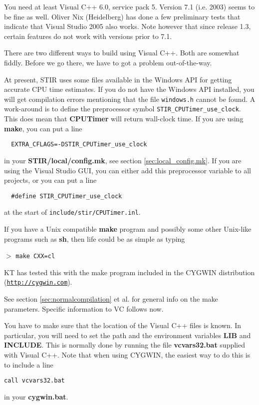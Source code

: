 \documentclass{article}
\def\R2Lurl#1#2{\mbox{\href{#1}{\tt #2}}}
\newcommand{\cmdline}[1]{\par \noindent $>$ \texttt{#1}\par}
\begin{document}
You need at least Visual C++ 6.0, service pack 5. 
Version 7.1 (i.e. 2003) seems to be fine as well. 
Oliver Nix (Heidelberg) 
has done a few preliminary tests that indicate that Visual Studio 2005 also 
works. 
Note however that since release 1.3, certain features do not work 
with versions prior to 7.1.

There are two different ways to build using Visual C++. Both 
are somewhat fiddly. Before we go there, we have to got a problem out-of-the-way.

{ 
}
At present, STIR uses some files available in the Windows API for 
getting accurate CPU time estimates. If you do not have the Windows API
installed, you will get compilation errors mentioning that 
the file \texttt{windows.h} cannot be found. A work-around is to
define the preprocessor symbol \texttt{STIR\_CPUTimer\_use\_clock}. 
This does mean that \textbf{CPUTimer} will return wall-clock time.
If you are using \textbf{make}, you can put a line
\begin{verbatim}
  EXTRA_CFLAGS=-DSTIR_CPUTimer_use_clock
\end{verbatim}
in your \textbf{STIR/local/config.mk}, see section \ref{sec:local_config.mk}.
If you are using the Visual Studio GUI, you can either add this preprocessor
variable to all projects, or you can put a line
\begin{verbatim}
  #define STIR_CPUTimer_use_clock
\end{verbatim}
at the start of \texttt{include/stir/CPUTimer.inl}.


{ 
}


If you have a Unix compatible \textbf{make} program and possibly some 
other Unix-like programs such as \textbf{sh}, then life could be as 
simple as typing
\cmdline{make CXX=cl}


KT has tested this with the make program included in the CYGWIN 
distribution (\R2Lurl{http://cygwin.com }{http://cygwin.com}). 



See section \ref{sec:normalcompilation} et al. for general info on the make parameters. 
Specific information to VC follows now.



You have to make sure that the location of the Visual C++ files 
is known. In particular, you will need to set the path and the 
environment variables \textbf{LIB} and \textbf{INCLUDE}. This is normally 
done by running the file \textbf{vcvars32.bat} supplied with Visual 
C++. Note that when using CYGWIN, the easiest way to do this 
is to include a line 
\begin{verbatim}
call vcvars32.bat
\end{verbatim} 
in your  \textbf{cygwin.bat}.
\end{document}
